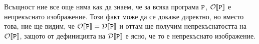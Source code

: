 \begin{remark}
  Всъщност ние все още няма как да знаем, че за всяка програма $\texttt{P}$,
  $\mathcal{O}\llbracket{\texttt{P}}\rrbracket$ е непрекъснато изображение.
  Този факт може да се докаже директно, но вместо това, ние ще видим, че
  $\mathcal{O}\llbracket{\texttt{P}}\rrbracket = \mathcal{D}\llbracket{\texttt{P}}\rrbracket$ и оттам ще получим непрекъснатостта на $\mathcal{O}\llbracket{\texttt{P}}\rrbracket$,
  защото от дефиницията на $\mathcal{D}\llbracket{\texttt{P}}\rrbracket$ е ясно, че то е непрекъснато изображение.
\end{remark}


